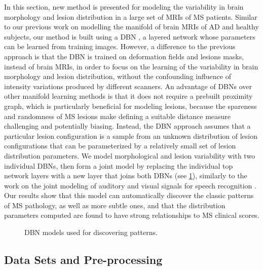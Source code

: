 In this section, new method is presented for modeling the variability in brain
morphology and lesion distribution in a large set of MRIs of MS patients.
Similar to our previous work on modelling the manifold of brain MRIs of AD and
healthy subjects, our method is built using a DBN \citep{hinton2006b}, a layered
network whose parameters can be learned from training images. However, a
difference to the previous approach is that the DBN is trained on deformation
fields and lesions masks, instead of brain MRIs, in order to focus on the
learning of the variability in brain morphology and lesion distribution, without
the confounding influence of intensity variations produced by different
scanners. An advantage of DBNs over other manifold learning methods is that it
does not require a prebuilt proximity graph, which is particularly beneficial
for modeling lesions, because the spareness and randomness of MS lesions make
defining a suitable distance measure challenging and potentially biasing.
Instead, the DBN approach assumes that a particular lesion configuration is a
sample from an unknown distribution of lesion configurations that can be
parameterized by a relatively small set of lesion distribution parameters. We
model morphological and lesion variability with two individual DBNs, then form a
joint model by replacing the individual top network layers with a new layer that
joins both DBNs (see \ref{fig:msdbnmodel}), similarly to the work on the joint
modeling of auditory and visual signals for speech recognition
\citep{ngiam2011}. Our results show that this model can automatically discover
the classic patterns of MS pathology, as well as more subtle ones, and that the
distribution parameters computed are found to have strong relationships to MS
clinical scores.

\begin{figure}[tb]
\centering

\caption{DBN models used for discovering patterns.}
\label{fig:msdbnmodel}
\end{figure}


\subsection{Data Sets and Pre-processing}

